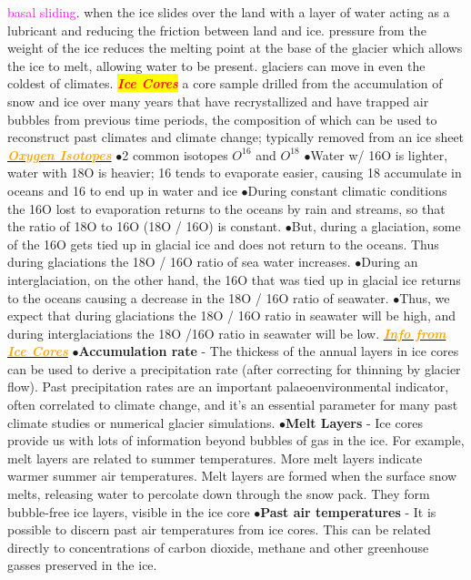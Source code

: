 \documentclass{article}
\newcommand{\ddd}{$\bullet$}
\newcommand{\red}[1]{\textcolor{red}{#1}}
\newcommand{\pink}[1]{\textcolor{magenta}{#1}}
\newcommand{\orange}[1]{\textcolor{orange}{#1}}
\newcommand{\mysection}[1]{\colorbox{yellow}{{\textbf{\textbf{\textit{\red{#1}}}}}}}
\newcommand{\mysub}[1]{\underline{\textbf{{\textit{\orange{#1}}}}}}
\newcommand{\vocab}[1]{{\pink{#1}}}
\begin{document}
\begin{multicols*}{4}
		\vocab{basal sliding}. when the ice slides over the land with a layer of water acting as a lubricant and reducing the friction between land and ice. pressure from the weight of the ice reduces the melting point at the base of the glacier which allows the ice to melt, allowing water to be present.  glaciers can move in even the coldest of climates.
        \mysection{Ice Cores} a core sample drilled from the accumulation of snow and ice over many years that have recrystallized and have trapped air bubbles from previous time periods, the composition of which can be used to reconstruct past climates and climate change; typically removed from an ice sheet
        \mysub{Oxygen Isotopes}
            \ddd 2 common isotopes $O^16$ and $O^18$
            \ddd Water w/ 16O is lighter, water with 18O is heavier; 16 tends to evaporate easier, causing 18 accumulate in oceans and 16 to end up in water and ice
            \ddd During constant climatic conditions the 16O lost to evaporation returns to the oceans by rain and streams, so that the ratio of 18O to 16O (18O / 16O) is constant.
            \ddd But, during a glaciation, some of the 16O gets tied up in glacial ice and does not return to the oceans. Thus during glaciations the 18O / 16O ratio of sea water increases.
            \ddd During an interglaciation, on the other hand, the 16O that was tied up in glacial ice returns to the oceans causing a decrease in the 18O / 16O ratio of seawater.
            \ddd Thus, we expect that during glaciations the 18O / 16O ratio in seawater will be high, and during interglaciations the 18O /16O ratio in seawater will be low.
        \mysub{Info from Ice Cores}
            \ddd \textbf{Accumulation rate} - The thickess of the annual layers in ice cores can be used to derive a precipitation rate (after correcting for thinning by glacier flow). Past precipitation rates are an important palaeoenvironmental indicator, often correlated to climate change, and it’s an essential parameter for many past climate studies or numerical glacier simulations.
            \ddd \textbf{Melt Layers} - Ice cores provide us with lots of information beyond bubbles of gas in the ice. For example, melt layers are related to summer temperatures. More melt layers indicate warmer summer air temperatures. Melt layers are formed when the surface snow melts, releasing water to percolate down through the snow pack. They form bubble-free ice layers, visible in the ice core
            \ddd \textbf{Past air temperatures} - It is possible to discern past air temperatures from ice cores. This can be related directly to concentrations of carbon dioxide, methane and other greenhouse gasses preserved in the ice.

\end{multicols*}
\end{document}
